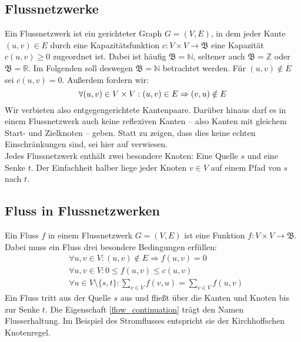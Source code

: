 \documentclass[12pt,a4paper,titlepage,onecolumn,ngerman,bibliography=totocnumbered]{scrartcl}
\theoremstyle{definition}
\theoremstyle{remark}
\begin{document}
\subsection{Flussnetzwerke}
Ein Flussnetzwerk ist ein gerichteter Graph $G = (V,E)$, in dem jeder Kante $(u,v) \in E$ durch eine Kapazitätsfunktion $c: V\times V\to\mathfrak{B}$ eine Kapazität $c(u,v) \geq 0$ zugeordnet ist.
Dabei ist häufig $\mathfrak{B} = \mathbb{N}$, seltener auch $\mathfrak{B} = \mathbb{Z}$ oder $\mathfrak{B} = \mathbb{R}$.
Im Folgenden soll deswegen $\mathfrak{B} = \mathbb{N}$ betrachtet werden.
Für $(u,v) \notin E$ sei $c(u,v) = 0$.
Außerdem fordern wir:
\begin{equation} \label{no_parallel}
	\forall (u,v)\in V\times V: (u,v)\in E \Rightarrow (v,u)\notin E\\
\end{equation}
Wir verbieten also entgegengerichtete Kantenpaare.
Darüber hinaus darf es in einem Flussnetzwerk auch keine reflexiven Kanten -- also Kanten mit gleichem Start- und Zielknoten -- geben.
Statt zu zeigen, dass dies keine echten Einschränkungen sind, sei hier auf \cite[][S. 724 f.]{Cormen09} verwiesen.\\
Jedes Flussnetzwerk enthält zwei besondere Knoten: Eine Quelle $s$ und eine Senke $t$.
Der Einfachheit halber liege jeder Knoten $v \in V$ auf einem Pfad von $s$ nach $t$.\\

\subsection{Fluss in Flussnetzwerken}
Ein Fluss $f$ in einem Flussnetzwerk $G=(V,E)$ ist eine Funktion $f: V \times V \to \mathfrak{B}$.
Dabei muss ein Fluss drei besondere Bedingungen erfüllen:
\begin{align}
	 & \forall u,v\in V\colon (u,v)\notin E\Rightarrow f(u,v) = 0 \label{only_on_edges}                          \\
	 & \forall u,v\in V\colon 0\leq f(u,v)\leq c(u,v) \label{limited_by_capacity}                                \\
	 & \forall u\in V\setminus\{s,t\}\colon\sum_{v\in V} f(v,u) = \sum_{v\in V} f(u,v) \label{flow_continuation}
\end{align}
Ein Fluss tritt aus der Quelle $s$ aus und fließt über die Kanten und Knoten bis zur Senke $t$. 
Die Eigenschaft \eqref{flow_continuation} trägt den Namen Flusserhaltung.
Im Beispiel des Stromflusses entspricht sie der Kirchhoffschen Knotenregel.
\end{document}
